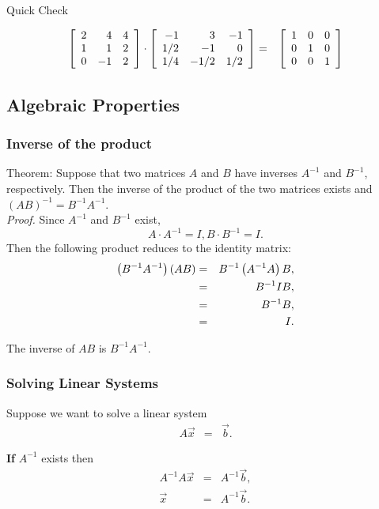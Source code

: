 \begin{frame}{Quick Check}

  \begin{eqnarray*}
    \left[ \begin{array}{rrr}  2 & 4 &  4 \\   1 &  1 & 2 \\   0 &   -1 &   2 \end{array} \right] \cdot
    \left[ \begin{array}{rrr} -1 & 3 & -1 \\ 1/2 & -1 & 0 \\ 1/4 & -1/2 & 1/2 \end{array} \right] & = &
    \left[ \begin{array}{rrr} 1 & 0 & 0 \\ 0 & 1 & 0 \\ 0 & 0 & 1 \end{array} \right]
  \end{eqnarray*}

\end{frame}

\subsection{Algebraic Properties}

\begin{frame}
  \frametitle{Inverse of the product}

  {\color{red}Theorem:} Suppose that two matrices $A$ and $B$ have
  inverses $A^{-1}$ and $B^{-1}$, respectively.  Then the inverse of
  the product of the two matrices exists and
  {\color{orange}$(AB)^{-1} = B^{-1}A^{-1}$}.\\

  \textit{{\color{blue}Proof.}} Since $A^{-1}$ and $B^{-1}$ exist,
   \begin{equation*}
     A \cdot A^{-1} = I, B \cdot B^{-1}  =  I.
   \end{equation*}
   Then the following product reduces to the identity matrix:
   \begin{eqnarray*}
    \left( B^{-1} A^{-1} \right) \left( A B \right) & = & B^{-1} \left( A^{-1} A \right) B, \\
    & = & B^{-1} I B, \\
    & = & B^{-1} B, \\
    & = & I.
  \end{eqnarray*}

  The inverse of $AB$ is $B^{-1}A^{-1}$.

\end{frame}


\begin{frame}
  \frametitle{Solving Linear Systems}

  Suppose we want to solve a linear system
  \begin{eqnarray*}
    A \vec{x} & = & \vec{b}.
  \end{eqnarray*}

  \textbf{If} $A^{-1}$ exists then
  \begin{eqnarray*}
    A^{-1} A \vec{x} & = & A^{-1} \vec{b}, \\
    \vec{x} & = & A^{-1} \vec{b}.
  \end{eqnarray*}


\end{frame}

